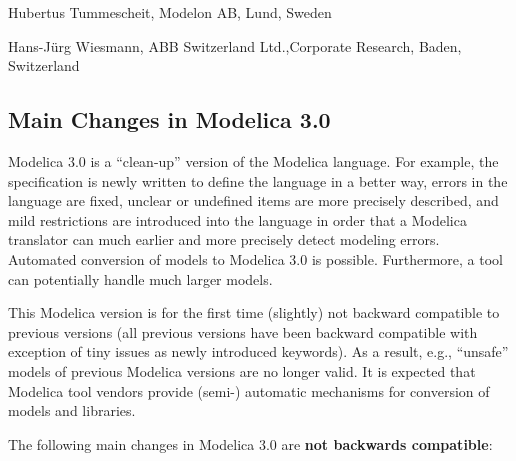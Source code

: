 \documentclass[10pt,a4paper]{report}
\def\doublelabel#1{\label{#1}\hypertarget{#1}{}}
\begin{document}
Hubertus Tummescheit, Modelon AB, Lund, Sweden

Hans-Jürg Wiesmann, ABB Switzerland Ltd.,Corporate Research, Baden,
Switzerland

\subsection{Main Changes in Modelica 3.0}\doublelabel{main-changes-in-modelica-3-0}

Modelica 3.0 is a ``clean-up'' version of the Modelica language. For
example, the specification is newly written to define the language in a
better way, errors in the language are fixed, unclear or undefined items
are more precisely described, and mild restrictions are introduced into
the language in order that a Modelica translator can much earlier and
more precisely detect modeling errors. Automated conversion of models to
Modelica 3.0 is possible. Furthermore, a tool can potentially handle
much larger models.

This Modelica version is for the first time (slightly) not backward
compatible to previous versions (all previous versions have been
backward compatible with exception of tiny issues as newly introduced
keywords). As a result, e.g., ``unsafe'' models of previous Modelica
versions are no longer valid. It is expected that Modelica tool vendors
provide (semi-) automatic mechanisms for conversion of models and
libraries.

The following main changes in Modelica 3.0 are \textbf{not backwards
compatible}:
\end{document}
